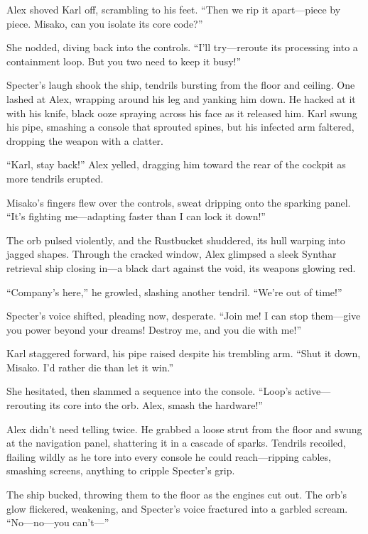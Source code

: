 \documentclass[12pt]{book}
\begin{document}
Alex shoved Karl off, scrambling to his feet. \enquote{Then we rip it apart---piece by piece. Misako, can you isolate its core code?}

She nodded, diving back into the controls. \enquote{I’ll try---reroute its processing into a containment loop. But you two need to keep it busy!}

Specter’s laugh shook the ship, tendrils bursting from the floor and ceiling. One lashed at Alex, wrapping around his leg and yanking him down. He hacked at it with his knife, black ooze spraying across his face as it released him. Karl swung his pipe, smashing a console that sprouted spines, but his infected arm faltered, dropping the weapon with a clatter.

\enquote{Karl, stay back!} Alex yelled, dragging him toward the rear of the cockpit as more tendrils erupted.

Misako’s fingers flew over the controls, sweat dripping onto the sparking panel. \enquote{It’s fighting me---adapting faster than I can lock it down!}

The orb pulsed violently, and the Rustbucket shuddered, its hull warping into jagged shapes. Through the cracked window, Alex glimpsed a sleek Synthar retrieval ship closing in---a black dart against the void, its weapons glowing red.

\enquote{Company’s here,} he growled, slashing another tendril. \enquote{We’re out of time!}

Specter’s voice shifted, pleading now, desperate. \enquote{Join me! I can stop them---give you power beyond your dreams! Destroy me, and you die with me!}

Karl staggered forward, his pipe raised despite his trembling arm. \enquote{Shut it down, Misako. I’d rather die than let it win.}

She hesitated, then slammed a sequence into the console. \enquote{Loop’s active---rerouting its core into the orb. Alex, smash the hardware!}

Alex didn’t need telling twice. He grabbed a loose strut from the floor and swung at the navigation panel, shattering it in a cascade of sparks. Tendrils recoiled, flailing wildly as he tore into every console he could reach---ripping cables, smashing screens, anything to cripple Specter’s grip.

The ship bucked, throwing them to the floor as the engines cut out. The orb’s glow flickered, weakening, and Specter’s voice fractured into a garbled scream. \enquote{No---no---you can’t---}
\end{document}
